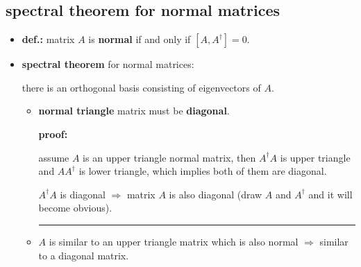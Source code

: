 \subsection{spectral theorem for normal matrices}
\begin{itemize}
	\item \textbf{def.:} matrix $A$ is \textbf{normal} if and only if $[A ,A^\dag] = 0$.
	
	\item \textbf{spectral theorem} for normal matrices:
	
	there is an orthogonal basis consisting of eigenvectors of $A$.
	
	\begin{tcolorbox}[title=proof:]
		\begin{itemize}
			\item \textbf{normal triangle} matrix must be \textbf{diagonal}.
			
			\noindent\hdashrule[0.5ex]{\linewidth}{0.5pt}{1mm} %
			
			\textbf{proof:}
			
			assume $A$ is an upper triangle normal matrix, then $A^\dag A$ is upper triangle and $A A^\dag$ is lower triangle, which implies both of them are diagonal.
			
			$A^\dag A$ is diagonal $\Longrightarrow$ matrix $A$ is also diagonal (draw $A$ and $A^\dag$ and it will become obvious).
			
			\noindent\rule[0.5ex]{\linewidth}{0.5pt} %
			
			\item $A$ is similar to an upper triangle matrix which is also normal $\Longrightarrow$ similar to a diagonal matrix.
		\end{itemize}
	\end{tcolorbox}
\end{itemize}

